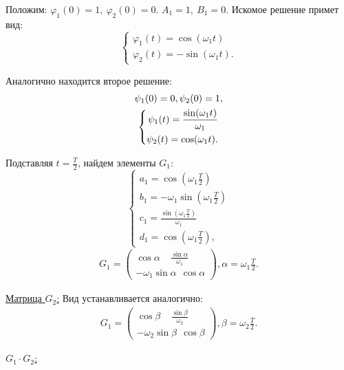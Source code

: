 Положим: $\varphi_1(0)=1,~\varphi_2(0)=0$. $A_1=1,~B_1=0$. Искомое решение примет вид: 
\begin{equation}
	\left\{\begin{aligned}
		\varphi_1(t) = \cos(\omega_1 t) \\
		\varphi_2(t) = -\sin(\omega_1 t).		
	\end{aligned}\right.
	\label{eq:84}	
\end{equation}

Аналогично находится второе решение:
\begin{gather}
	\psi_1(0)=0, \psi_2(0)=1, \notag \\
	\left\{\begin{aligned}
		\psi_1(t) = \frac{\sin(\omega_1 t)}{\omega_1} \\
		\psi_2(t) = \cos(\omega_1 t).		
	\end{aligned}\right.
	\label{eq:85}	
\end{gather}

Подставляя $t=\frac{T}{2}$, найдем элементы $G_1$:
\begin{equation}
	\left\{\begin{aligned}
		a_1 = \cos(\omega_1 \frac{T}{2}) \\
		b_1 = -\omega_1 \sin(\omega_1 \frac{T}{2}) \\
		c_1 = \frac{\sin(\omega_1 \frac{T}{2})}{\omega_1} \\
		d_1 = \cos(\omega_1 \frac{T}{2}),	
	\end{aligned}\right.
	\label{eq:86}	
\end{equation}
\begin{gather*}
	G_1= 
	\begin{pmatrix}
		\cos \alpha~~~~~\frac{\sin\alpha}{\omega_1} \\
		-\omega_1 \sin \alpha~~\cos \alpha
	\end{pmatrix}
	, 
	\alpha=\omega_1 \frac{T}{2}.	
\end{gather*}

\underline{Матрица $G_2$:}
Вид устанавливается аналогично:
\begin{gather*}
	G_1= 
	\begin{pmatrix}
		\cos \beta~~~~~\frac{\sin\beta}{\omega_2} \\
		-\omega_2 \sin \beta~~\cos \beta
	\end{pmatrix}
	, 
	\beta=\omega_2 \frac{T}{2}.	
\end{gather*}

\underline{ $G_1\cdot G_2$:}

